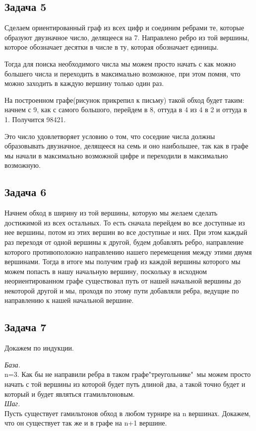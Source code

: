 	\subsection{Задача 5}
	Сделаем ориентированный граф из всех цифр и соединим ребрами те, которые образуют двузначное число, делящееся на 7. Направлено ребро из той вершины, которое обозначает десятки в числе в ту, которая обозначает единицы.

	Тогда для поиска необходимого числа мы можем просто начать с как можно большего числа и переходить в максимально возможное, при этом помня, что можно заходить в каждую вершину только один раз. 
	
	На построенном графе(рисунок прикрепил к письму) такой обход будет таким: начнем с 9, как с самого большого, перейдем в 8, оттуда в 4 из 4 в 2 и оттуда в 1. Получится 98421.
	
	Это число удовлетворяет условию о том, что соседние числа должны образовывать двузначное, делящееся на семь и оно наибольшее, так как в графе мы начали в максимально возможной цифре и переходили в максимально возможную. 
	
	\subsection{Задача 6}
	Начнем обход в ширину из той вершины, которую мы желаем сделать достижимой из всех остальных. То есть сначала перейдем во все доступные из нее вершины, потом из этих вершин во все доступные и них. При этом каждый раз переходя от одной вершины к другой, будем добавлять ребро, направление которого противоположно направлению нашего перемещения между этими двумя вершинами. 
	Тогда в итоге мы получим граф из каждой вершины которого мы можем попасть в нашу начальную вершину, поскольку в исходном неориентированном графе существовал путь от нашей начальной вершины до некоторой другой и мы, проходя по этому пути добавляли ребра, ведущие по направлению к нашей начальной вершине. 
	
	\subsection{Задача 7}
	Докажем по индукции. 
	
	\textit{База.}\\
	n=3. Как бы не направили ребра в таком графе"треугольнике"\ мы можем просто начать с той вершины из которой будет путь длиной два, а такой точно будет и который и будет являться ггамильтоновым. \\
	\textit{Шаг.} \\
	Пусть существует гамильтонов обход в любом турнире на n вершинах. Докажем, что он существует так же и в графе на n+1 вершине.
	
